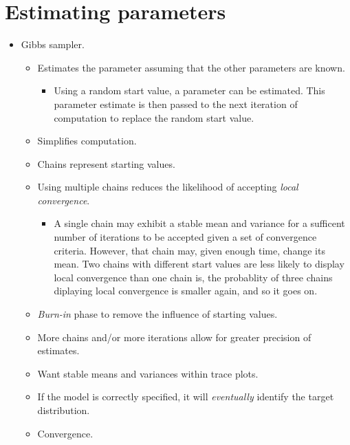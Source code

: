 \documentclass[
]{book}
\providecommand{\tightlist}{%
  \setlength{\itemsep}{0pt}\setlength{\parskip}{0pt}}
\begin{document}
\section{Estimating parameters}\label{estimating-parameters}

\begin{itemize}
\tightlist
\item
  Gibbs sampler.

  \begin{itemize}
  \tightlist
  \item
    Estimates the parameter assuming that the other parameters are known.

    \begin{itemize}
    \tightlist
    \item
      Using a random start value, a parameter can be estimated. This parameter estimate is then passed to the next iteration of computation to replace the random start value.
    \end{itemize}
  \item
    Simplifies computation.
  \item
    Chains represent starting values.
  \item
    Using multiple chains reduces the likelihood of accepting \emph{local convergence}.

    \begin{itemize}
    \tightlist
    \item
      A single chain may exhibit a stable mean and variance for a sufficent number of iterations to be accepted given a set of convergence criteria. However, that chain may, given enough time, change its mean. Two chains with different start values are less likely to display local convergence than one chain is, the probablity of three chains diplaying local convergence is smaller again, and so it goes on.
    \end{itemize}
  \item
    \emph{Burn-in} phase to remove the influence of starting values.
  \item
    More chains and/or more iterations allow for greater precision of estimates.
  \item
    Want stable means and variances within trace plots.
  \item
    If the model is correctly specified, it will \emph{eventually} identify the target distribution.
  \item
    Convergence.


\end{itemize}
\end{itemize}
\end{document}
